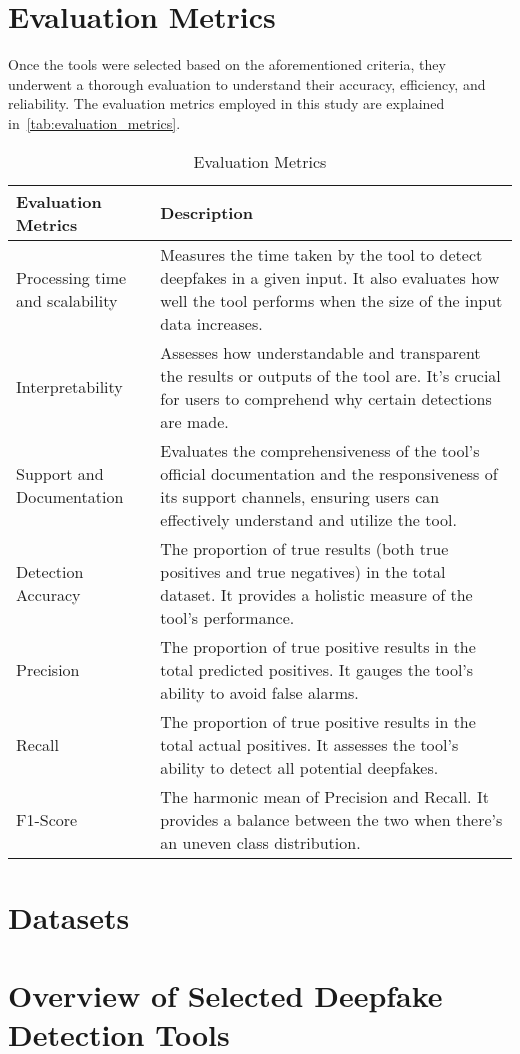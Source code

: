 \section{Evaluation Metrics}
Once the tools were selected based on the aforementioned criteria, they underwent
a thorough evaluation to understand their accuracy, efficiency, and
reliability. The evaluation metrics employed in this study are explained in~\autoref{tab:evaluation_metrics}.

\begin{table}
	\caption{Evaluation Metrics}\label{tab:evaluation_metrics}
	\centering
	\small
	\begin{tabularx}{\textwidth}{l X}
		\toprule
		\textbf{Evaluation Metrics}     & \textbf{Description}                                                                                                                                                                 \\
		\midrule
		Processing time and scalability & Measures the time taken by the tool to detect deepfakes in a given input. It also evaluates how well the tool performs when the size of the input data increases.                    \\
		\addlinespace
		Interpretability                & Assesses how understandable and transparent the results or outputs of the tool are. It's crucial for users to comprehend why certain detections are made.                            \\
		\addlinespace
		Support and Documentation       & Evaluates the comprehensiveness of the tool's official documentation and the responsiveness of its support channels, ensuring users can effectively understand and utilize the tool. \\
		\addlinespace
		Detection Accuracy              & The proportion of true results (both true positives and true negatives) in the total dataset. It provides a holistic measure of the tool's performance.                              \\
		\addlinespace
		Precision                       & The proportion of true positive results in the total predicted positives. It gauges the tool's ability to avoid false alarms.                                                        \\
		\addlinespace
		Recall                          & The proportion of true positive results in the total actual positives. It assesses the tool's ability to detect all potential deepfakes.                                             \\
		\addlinespace
		F1-Score                        & The harmonic mean of Precision and Recall. It provides a balance between the two when there's an uneven class distribution.                                                          \\
		\bottomrule
	\end{tabularx}
\end{table}

\section{Datasets}
\section{Overview of Selected Deepfake Detection Tools}